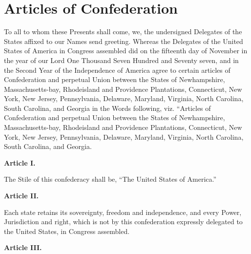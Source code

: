 %
%
%
%
%
%

\chapter{Articles of Confederation}

To all to whom these Presents shall come, we, the undersigned Delegates of the States affixed to our Names send greeting. Whereas the Delegates of the United States of America in Congress assembled did on the fifteenth day of November in the year of our Lord One Thousand Seven Hundred and Seventy seven, and in the Second Year of the Independence of America agree to certain articles of Confederation and perpetual Union between the States of Newhampshire, Massachusetts-bay, Rhodeisland and Providence Plantations, Connecticut, New York, New Jersey, Pennsylvania, Delaware, Maryland, Virginia, North Carolina, South Carolina, and Georgia in the Words following, viz. “Articles of Confederation and perpetual Union between the States of Newhampshire, Massachusetts-bay, Rhodeisland and Providence Plantations, Connecticut, New York, New Jersey, Pennsylvania, Delaware, Maryland, Virginia, North Carolina, South Carolina, and Georgia.

\begin{center}
\textbf{Article I.}  
\end{center}

The Stile of this confederacy shall be, “The United States of America.”

\begin{center}
\textbf{Article II.}  
\end{center}

Each state retains its sovereignty, freedom and independence, and every Power, Jurisdiction and right, which is not by this confederation expressly delegated to the United States, in Congress assembled.

\begin{center}
\textbf{Article III.}  
\end{center}

